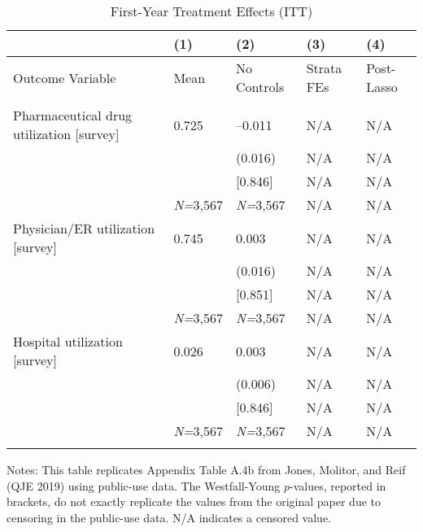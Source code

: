 \documentclass{article}
\begin{document}
\setlength{\tabcolsep}{6pt}
\begin{table}[tbp] \centering
{}

\caption{First-Year Treatment Effects (ITT)}
\label{tab:appendix_itt_spend_vars_survey_0816_0717}
{\scriptsize
\begin{tabularx}{\linewidth}{lCCCC}

\toprule
&{(1)}&{(2)}&{(3)}&{(4)} \tabularnewline \midrule
{Outcome Variable}&{Mean}&{No Controls}&{Strata FEs}&{Post-Lasso} \tabularnewline
\midrule 
\addlinespace[1.4ex]
 \tabularnewline
\midrule Pharmaceutical drug utilization [survey]&0.725&--0.011&N/A&N/A \tabularnewline
&&(0.016)&N/A&N/A \tabularnewline
&&[0.846]&N/A&N/A \tabularnewline
&\textit{N=}3,567&\textit{N=}3,567&N/A&N/A \tabularnewline
\addlinespace[1.4ex]
Physician/ER utilization [survey]&0.745&0.003&N/A&N/A \tabularnewline
&&(0.016)&N/A&N/A \tabularnewline
&&[0.851]&N/A&N/A \tabularnewline
&\textit{N=}3,567&\textit{N=}3,567&N/A&N/A \tabularnewline
\addlinespace[1.4ex]
Hospital utilization [survey]&0.026&0.003&N/A&N/A \tabularnewline
&&(0.006)&N/A&N/A \tabularnewline
&&[0.846]&N/A&N/A \tabularnewline
&\textit{N=}3,567&\textit{N=}3,567&N/A&N/A \tabularnewline
\bottomrule\addlinespace[-1.5ex] 

\end{tabularx}
\begin{flushleft}
\footnotesize Notes: This table replicates Appendix Table A.4b from Jones, Molitor, and Reif (QJE 2019) using public-use data. The Westfall-Young \(p\)-values, reported in brackets, do not exactly replicate the values from the original paper due to censoring in the public-use data. N/A indicates a censored value.
\end{flushleft}
}
\end{table}
\end{document}
